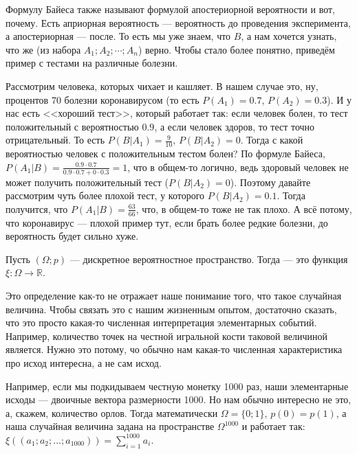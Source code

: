 \documentclass{article}
\begin{document}
\begin{itemize}
\begin{Comment}
            Формулу Байеса также называют формулой апостериорной вероятности и вот, почему. Есть априорная вероятность --- вероятность до проведения эксперимента, а апостериорная --- после. То есть мы уже знаем, что $B$, а нам хочется узнать, что же (из набора $A_1;A_2;\cdots;A_n$) верно. Чтобы стало более понятно, приведём пример с тестами на различные болезни.
        \end{Comment}
        \begin{Example}
            Рассмотрим человека, которых чихает и кашляет. В нашем случае это, ну, процентов 70 болезни коронавирусом (то есть $P(A_1)=0.7$, $P(A_2)=0.3$). И у нас есть  <<хороший тест>>, который работает так: если человек болен, то тест положительный с вероятностью $0.9$, а если человек здоров, то тест точно отрицательный. То есть $P(B|A_1)=\frac9{10}$, $P(B|A_2)=0$. Тогда с какой вероятностью человек с положительным тестом болен? По формуле Байеса, $P(A_1|B)=\frac{0.9\cdot0.7}{0.9\cdot0.7+0\cdot0.3}=1$, что в общем-то логично, ведь здоровый человек не может получить положительный тест ($P(B|A_2)=0$). Поэтому давайте рассмотрим чуть более плохой тест, у которого $P(B|A_2)=0.1$. Тогда получится, что $P(A_1|B)=\frac{63}{66}$, что, в общем-то тоже не так плохо. А всё потому, что коронавирус --- плохой пример тут, если брать более редкие болезни, до вероятность будет сильно хуже.
        \end{Example}
        \dfn Пусть $(\Omega;p)$ --- дискретное вероятностное пространство. Тогда  --- это функция $\xi\colon\Omega\to\mathbb R$.
        \begin{Comment}
            Это определение как-то не отражает наше понимание того, что такое случайная величина. Чтобы связать это с нашим жизненным опытом, достаточно сказать, что это просто какая-то численная интерпретация элементарных событий. Например, количество точек на честной игральной кости таковой величиной является. Нужно это потому, чо обычно нам какая-то численная характеристика про исход интересна, а не сам исход.
        \end{Comment}
        \begin{Example}
            Например, если мы подкидываем честную монетку 1000 раз, наши элементарные исходы --- двоичные вектора размерности 1000. Но нам обычно интересно не это, а, скажем, количество орлов. Тогда математически $\Omega=\{0;1\}$, $p(0)=p(1)$, а наша случайная величина задана на пространстве $\Omega^{1000}$ и работает так: $\xi((a_1;a_2;\ldots;a_{1000}))=\sum\limits_{i=1}^{1000}a_i$.

\end{Example}
\end{itemize}
\end{document}

